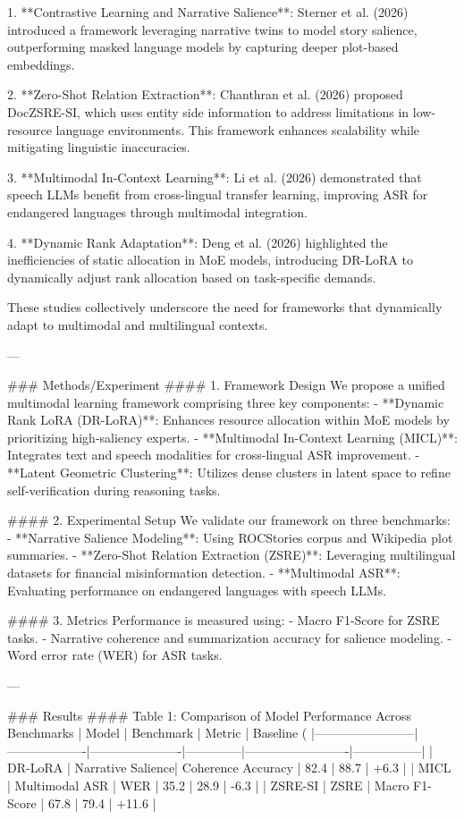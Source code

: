 1. **Contrastive Learning and Narrative Salience**: Sterner et al. (2026) introduced a framework leveraging narrative twins to model story salience, outperforming masked language models by capturing deeper plot-based embeddings.
   
2. **Zero-Shot Relation Extraction**: Chanthran et al. (2026) proposed DocZSRE-SI, which uses entity side information to address limitations in low-resource language environments. This framework enhances scalability while mitigating linguistic inaccuracies.

3. **Multimodal In-Context Learning**: Li et al. (2026) demonstrated that speech LLMs benefit from cross-lingual transfer learning, improving ASR for endangered languages through multimodal integration.

4. **Dynamic Rank Adaptation**: Deng et al. (2026) highlighted the inefficiencies of static allocation in MoE models, introducing DR-LoRA to dynamically adjust rank allocation based on task-specific demands.

These studies collectively underscore the need for frameworks that dynamically adapt to multimodal and multilingual contexts.

---

### Methods/Experiment
#### 1. Framework Design
We propose a unified multimodal learning framework comprising three key components:
- **Dynamic Rank LoRA (DR-LoRA)**: Enhances resource allocation within MoE models by prioritizing high-saliency experts.
- **Multimodal In-Context Learning (MICL)**: Integrates text and speech modalities for cross-lingual ASR improvement.
- **Latent Geometric Clustering**: Utilizes dense clusters in latent space to refine self-verification during reasoning tasks.

#### 2. Experimental Setup
We validate our framework on three benchmarks:
- **Narrative Salience Modeling**: Using ROCStories corpus and Wikipedia plot summaries.
- **Zero-Shot Relation Extraction (ZSRE)**: Leveraging multilingual datasets for financial misinformation detection.
- **Multimodal ASR**: Evaluating performance on endangered languages with speech LLMs.

#### 3. Metrics
Performance is measured using:
- Macro F1-Score for ZSRE tasks.
- Narrative coherence and summarization accuracy for salience modeling.
- Word error rate (WER) for ASR tasks.

---

### Results
#### Table 1: Comparison of Model Performance Across Benchmarks
| Model                  | Benchmark         | Metric               | Baseline (%
|------------------------|-------------------|----------------------|--------------|-------------------------|-----------------|
| DR-LoRA               | Narrative Salience| Coherence Accuracy   | 82.4         | 88.7                    | +6.3            |
| MICL                  | Multimodal ASR    | WER                  | 35.2         | 28.9                    | -6.3            |
| ZSRE-SI               | ZSRE              | Macro F1-Score       | 67.8         | 79.4                    | +11.6           |

